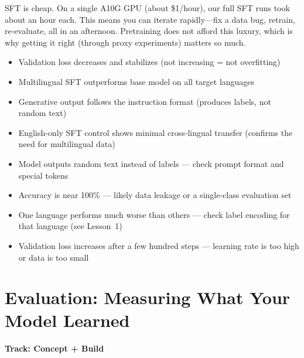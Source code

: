 \documentclass[11pt,a4paper]{article}
\begin{document}
\begin{tip}
SFT is cheap. On a single A10G GPU (about \$1/hour), our full SFT runs took about an hour each. This means you can iterate rapidly---fix a data bug, retrain, re-evaluate, all in an afternoon. Pretraining does not afford this luxury, which is why getting it right (through proxy experiments) matters so much.
\end{tip}

\begin{successcheck}
\begin{itemize}[nosep]
  \item Validation loss decreases and stabilizes (not increasing = not overfitting)
  \item Multilingual SFT outperforms base model on all target languages
  \item Generative output follows the instruction format (produces labels, not random text)
  \item English-only SFT control shows minimal cross-lingual transfer (confirms the need for multilingual data)
\end{itemize}
\end{successcheck}

\begin{failuresign}
\begin{itemize}[nosep]
  \item Model outputs random text instead of labels --- check prompt format and special tokens
  \item Accuracy is near 100\% --- likely data leakage or a single-class evaluation set
  \item One language performs much worse than others --- check label encoding for that language (see Lesson~1)
  \item Validation loss increases after a few hundred steps --- learning rate is too high or data is too small
\end{itemize}
\end{failuresign}


\section{Evaluation: Measuring What Your Model Learned}
\label{ch:eval}

\begin{center}
\colorbox{lightaccent}{\textbf{Track: Concept + Build}}
\end{center}
\end{document}

